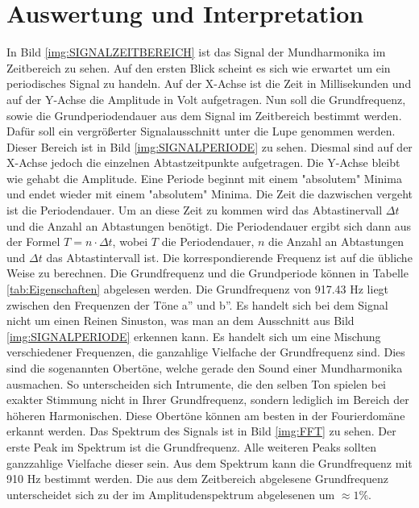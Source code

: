 \section{Auswertung und Interpretation}
\label{chap:VERSUCH_1_AUSWERTUNG}
In Bild \ref{img:SIGNALZEITBEREICH} ist das Signal der Mundharmonika im Zeitbereich zu sehen. Auf den ersten Blick scheint es sich wie erwartet um ein periodisches Signal zu handeln. Auf der X-Achse ist die Zeit in Millisekunden und auf der Y-Achse die Amplitude in Volt aufgetragen. Nun soll die Grundfrequenz, sowie die Grundperiodendauer aus dem Signal im Zeitbereich bestimmt werden. Dafür soll ein vergrößerter Signalausschnitt  unter die Lupe genommen werden. Dieser Bereich ist in Bild \ref{img:SIGNALPERIODE} zu sehen. Diesmal sind auf der X-Achse jedoch die einzelnen Abtastzeitpunkte aufgetragen. Die Y-Achse bleibt wie gehabt die Amplitude. Eine Periode beginnt mit einem "absolutem" Minima und endet wieder mit einem "absolutem" Minima. Die Zeit die dazwischen vergeht ist die Periodendauer. Um an diese Zeit zu kommen wird das Abtastinervall $\Delta t$ und die Anzahl an Abtastungen benötigt. Die Periodendauer ergibt sich dann aus der Formel $T = n \cdot \Delta t$, wobei $T$ die Periodendauer, $n$ die Anzahl an Abtastungen und $\Delta t$ das Abtastintervall ist. Die korrespondierende Frequenz ist auf die übliche Weise zu berechnen. Die Grundfrequenz und die Grundperiode können in Tabelle \ref{tab:Eigenschaften} abgelesen werden. Die Grundfrequenz von 917.43 Hz liegt zwischen den Frequenzen der Töne a'' und b''. Es handelt sich bei dem Signal nicht um einen Reinen Sinuston, was man an dem Ausschnitt aus Bild \ref{img:SIGNALPERIODE} erkennen kann. Es handelt sich um eine Mischung verschiedener Frequenzen, die ganzahlige Vielfache der Grundfrequenz sind. Dies sind die sogenannten Obertöne, welche gerade den Sound einer Mundharmonika ausmachen. So unterscheiden sich Intrumente, die den selben Ton spielen bei exakter Stimmung nicht in Ihrer Grundfrequenz, sondern lediglich im Bereich der höheren Harmonischen. Diese Obertöne können am besten in der Fourierdomäne erkannt werden. Das Spektrum des Signals ist in Bild \ref{img:FFT} zu sehen. Der erste Peak im Spektrum ist die Grundfrequenz. Alle weiteren Peaks sollten ganzzahlige Vielfache dieser sein. Aus dem Spektrum kann die Grundfrequenz mit 910 Hz bestimmt werden. Die aus dem Zeitbereich abgelesene Grundfrequenz unterscheidet sich zu der im Amplitudenspektrum abgelesenen um $\approx 1\%$.
